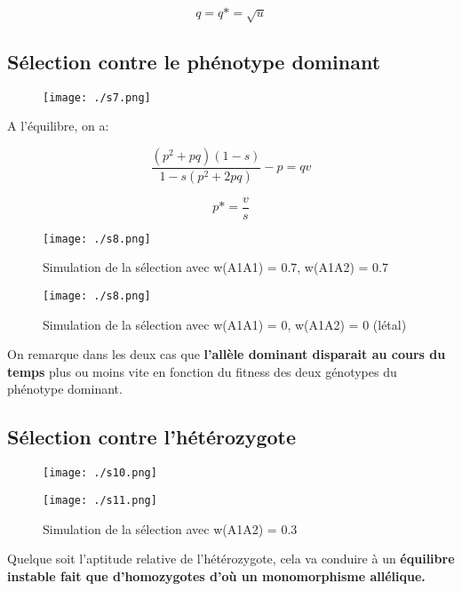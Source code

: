 \documentclass{article}
\begin{document}
\begin{equation}
q = q* = \sqrt{u}
\end{equation}


\subsection{Sélection contre le phénotype dominant}

\begin{figure}[H]
\texttt{[image: ./s7.png]}
\end{figure}

A l'équilibre, on a:

\begin{equation}
\frac{(p^2+pq)(1-s)}{1-s(p^2+2pq)} - p = qv
\end{equation}

\begin{equation}
p* = \frac{v}{s}
\end{equation}

\begin{figure}[H]
\texttt{[image: ./s8.png]}
\caption{Simulation de la sélection avec w(A1A1) = 0.7, w(A1A2) = 0.7}
\end{figure}

\begin{figure}[H]
\texttt{[image: ./s8.png]}
\caption{Simulation de la sélection avec w(A1A1) = 0, w(A1A2) = 0 (létal)}
\end{figure}

On remarque dans les deux cas que \textbf{l'allèle dominant disparait au cours du temps} plus ou moins vite en fonction du fitness des deux génotypes du phénotype dominant.

\subsection{Sélection contre l'hétérozygote}

\begin{figure}[H]
\texttt{[image: ./s10.png]}
\end{figure}

\begin{figure}[H]
\texttt{[image: ./s11.png]}
\caption{Simulation de la sélection avec w(A1A2) = 0.3}
\end{figure}

Quelque soit l'aptitude relative de l'hétérozygote, cela va conduire à un \textbf{équilibre instable fait que d'homozygotes d'où un monomorphisme allélique.}
\end{document}
